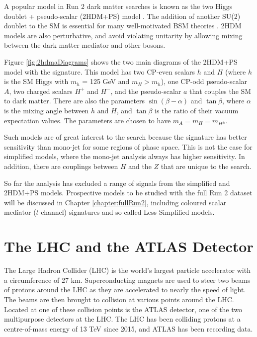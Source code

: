 A popular model in Run 2 \monoX dark matter searches is known as the two Higgs doublet + pseudo-scalar (2HDM+PS) model \cite{Bauer:2017ota}. The addition of another SU(2) doublet to the SM is essential for many well-motivated BSM theories \cite{Branco:2011iw}. 2HDM models are also perturbative, and avoid violating unitarity by allowing mixing between the dark matter mediator and other bosons. 

Figure \ref{fig:2hdmaDiagrams} shows the two main diagrams of the 2HDM+PS model with the \monoZ signature. This model has two CP-even scalars $h$ and $H$ (where $h$ is the SM Higgs with $m_h$ = 125 GeV and $m_H > m_h$), one CP-odd pseudo-scalar $A$, two charged scalars $H^+$ and $H^-$, and the pseudo-scalar $a$ that couples the SM to dark matter. There are also the parameters $\sin(\beta-\alpha)$ and $\tan \beta$, where $\alpha$ is the mixing angle between $h$ and $H$, and $\tan \beta$ is the ratio of their vacuum expectation values. The parameters are chosen to have $m_A = m_H = m_{H^\pm}$.

Such models are of great interest to the \monoZ search because the \monoZ signature has better sensitivity than mono-jet for some regions of phase space. This is not the case for simplified models, where the mono-jet analysis always has higher sensitivity. In addition, there are couplings between $H$ and the $Z$ that are unique to the \monoZ search.

So far the \monoZ analysis has excluded a range of signals from the simplified and 2HDM+PS models. Prospective models to be studied with the full Run 2 dataset will be discussed in Chapter \ref{chapter:fullRun2}, including coloured scalar mediator ($t$-channel) signatures and so-called Less Simplified models.

\clearpage

\section{The LHC and the ATLAS Detector}

The Large Hadron Collider (LHC) is the world's largest particle accelerator with a circumference of 27 km. Superconducting magnets are used to steer two beams of protons around the LHC as they are accelerated to nearly the speed of light. The beams are then brought to collision at various points around the LHC. Located at one of these collision points is the ATLAS detector, one of the two multipurpose detectors at the LHC. The LHC has been colliding protons at a centre-of-mass energy of 13 TeV since 2015, and ATLAS has been recording data.

